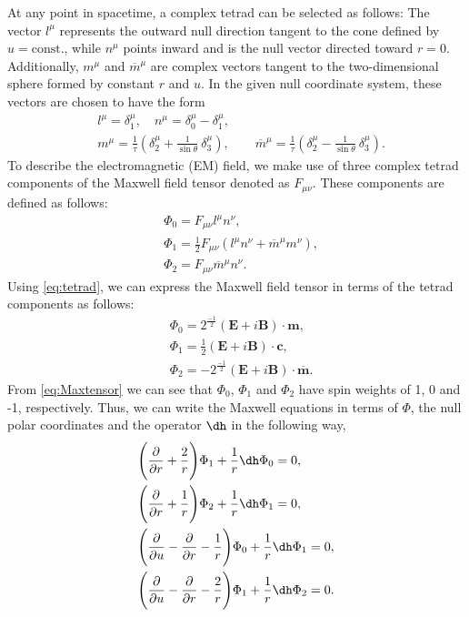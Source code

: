 At any point in spacetime, a complex tetrad can be selected as follows: The vector $l^{\mu}$ represents the outward null direction tangent to the cone defined by $u = \text{const.}$, while $n^{\mu}$ points inward and is the null vector directed toward $r = 0$. Additionally, $m^{\mu}$ and $\overline{m}^{\mu}$ are complex vectors tangent to the two-dimensional sphere formed by constant $r$ and $u$. In the given null coordinate system, these vectors are chosen to have the form 
\begin{align}\label{eq:tetrad}
  & l^{\mu} = \delta_{1}^{\mu}, \quad n^{\mu} = \delta_{0}^{\mu} - \delta_{1}^{\mu}, \nonumber \\
  & m^{\mu} = \displaystyle\frac{1}{\tau}\left(\delta_{2}^{\mu} + \displaystyle\frac{1}{\sin\theta}\ \delta_{3}^{\mu}\right), \qquad \overline{m}^{\mu} = \displaystyle\frac{1}{\tau}\left(\delta_{2}^{\mu} - \displaystyle\frac{1}{\sin\theta}\ \delta_{3}^{\mu}\right).
\end{align}
To describe the electromagnetic (EM) field, we make use of three complex tetrad components of the Maxwell field tensor denoted as $F_{\mu \nu}$. These components are defined as follows:
\begin{align}\label{eq:Maxtensor}
  & \Phi_{0} = F_{\mu \nu}l^{\mu}n^{\nu}, \nonumber \\
  & \Phi_{1} = \frac{1}{2} F_{\mu \nu}(l^{\mu}n^{\nu} + \overline{m}^{\mu}m^{\nu}), \nonumber \\
  & \Phi_{2} = F_{\mu \nu}\overline{m}^{\mu}n^{\nu}.
\end{align}
Using \eqref{eq:tetrad}, we can express the Maxwell field tensor in terms of the tetrad components as follows:
\begin{align}\label{eq:Maxtensorintetrad}
  & \Phi_{0} = 2^{\frac{-1}{2}}(\boldsymbol{E} + i\boldsymbol{B})\cdot \boldsymbol{m}, \nonumber \\
  & \Phi_{1} = \frac{1}{2}(\boldsymbol{E} + i\boldsymbol{B})\cdot \boldsymbol{c} , \nonumber \\
  & \Phi_{2} = -2^{\frac{-1}{2}}(\boldsymbol{E} + i\boldsymbol{B})\cdot \boldsymbol{\overline{m}}.
\end{align}
From \eqref{eq:Maxtensor} we can see that $\Phi_{0}$, $\Phi_{1}$ and $\Phi_{2}$ have spin weights of 1, 0 and -1, respectively. Thus, we can write the Maxwell equations in terms of $\Phi$, the null polar coordinates and the operator $\dh$ in the following way,
\begin{align}\label{eq:MaxwellEqns}
  & \Biggl(\frac{\partial}{\partial r} + \frac{2}{r}\Biggr)\Phi_{1}  + \frac{1}{r}\dh \Phi_{0} = 0, \\ 
  & \Biggl(\frac{\partial}{\partial r} + \frac{1}{r}\Biggr)\Phi_{2}  + \frac{1}{r}\dh \Phi_{1} = 0, \\ 
  & \Biggl(\frac{\partial}{\partial u} - \frac{\partial}{\partial r} - \frac{1}{r}\Biggr)\Phi_{0}  + \frac{1}{r}\dh \Phi_{1} = 0, \\ 
  & \Biggl(\frac{\partial}{\partial u} - \frac{\partial}{\partial r} - \frac{2}{r}\Biggr)\Phi_{1}  + \frac{1}{r}\dh \Phi_{2} = 0. 
\end{align}
